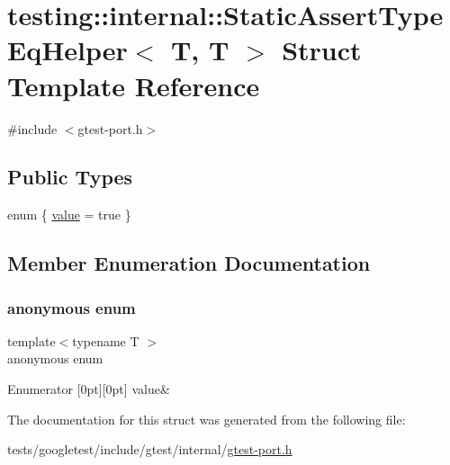 \hypertarget{structtesting_1_1internal_1_1StaticAssertTypeEqHelper_3_01T_00_01T_01_4}{}\section{testing\+:\+:internal\+:\+:Static\+Assert\+Type\+Eq\+Helper$<$ T, T $>$ Struct Template Reference}
\label{structtesting_1_1internal_1_1StaticAssertTypeEqHelper_3_01T_00_01T_01_4}


{\ttfamily \#include $<$gtest-\/port.\+h$>$}

\subsection*{Public Types}
\begin{DoxyCompactItemize}
\item 
enum \{ \hyperlink{structtesting_1_1internal_1_1StaticAssertTypeEqHelper_3_01T_00_01T_01_4_a17df26ca6530ab723f563ade9017f9d6a63c475f543e4e977d43c5093dd2b7f3f}{value} = true
 \}
\end{DoxyCompactItemize}


\subsection{Member Enumeration Documentation}
\mbox{\label{structtesting_1_1internal_1_1StaticAssertTypeEqHelper_3_01T_00_01T_01_4_a17df26ca6530ab723f563ade9017f9d6}} 
\subsubsection{\texorpdfstring{anonymous enum}{anonymous enum}}
{\footnotesize\ttfamily template$<$typename T $>$ \\
anonymous enum}

\begin{DoxyEnumFields}{Enumerator}
[0pt][0pt]{}\mbox{\label{structtesting_1_1internal_1_1StaticAssertTypeEqHelper_3_01T_00_01T_01_4_a17df26ca6530ab723f563ade9017f9d6a63c475f543e4e977d43c5093dd2b7f3f}} 
value&\\
\hline

\end{DoxyEnumFields}


The documentation for this struct was generated from the following file\+:\begin{DoxyCompactItemize}
\item 
tests/googletest/include/gtest/internal/\hyperlink{gtest-port_8h}{gtest-\/port.\+h}\end{DoxyCompactItemize}
